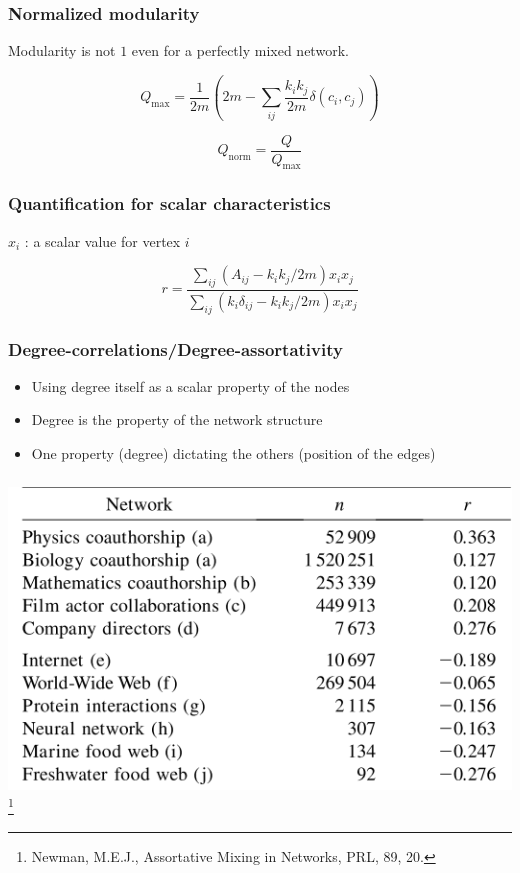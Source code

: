 \documentclass{beamer}
\begin{document}
\begin{frame}
    \frametitle{Normalized modularity}
    \centering
    Modularity is not $1$ even for a perfectly mixed network.

    \pause

    $$Q_{\text{max}} = \frac{1}{2m}\left(2m-\sum\limits_{ij}\frac{k_ik_j}{2m}\delta(c_i,c_j)\right)$$

    \pause
    $$Q_{\text{norm}} = \frac{Q}{Q_{\text{max}}}$$
\end{frame}
\begin{frame}
    \frametitle{Quantification for scalar characteristics}
    \centering
    $x_i$ : a scalar value for vertex $i$
    \vspace{1em}

    $$r = \frac{\sum\limits_{ij}(A_{ij}-k_ik_j/2m)x_ix_j}{\sum\limits_{ij}(k_i\delta_{ij}-k_ik_j/2m)x_ix_j}$$
\end{frame}
\begin{frame}
    \frametitle{Degree-correlations/Degree-assortativity}
    
    \begin{itemize}
    \setlength\itemsep{1em}
        \item{Using degree itself as a scalar property of the nodes}
        \item{Degree is the property of the network structure}
        \item{One property (degree) dictating the others (position of the edges)}
    \end{itemize}
\end{frame}
\begin{frame}
    \frametitle{}
    \centering
    \includegraphics[width=\columnwidth]{assortativity_list.png}
\footnote{Newman, M.E.J., Assortative Mixing in Networks, PRL, 89, 20.}
\end{frame}
\end{document}
